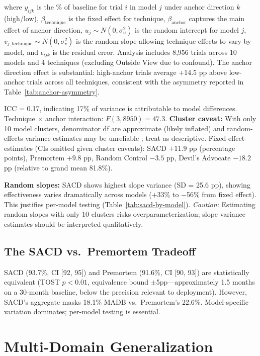 \documentclass[11pt]{article}
\begin{document}
where $y_{ijk}$ is the \% of baseline for trial $i$ in model $j$ under anchor direction $k$ (high/low), $\beta_{\text{technique}}$ is the fixed effect for technique, $\beta_{\text{anchor}}$ captures the main effect of anchor direction, $u_j \sim N(0, \sigma^2_u)$ is the random intercept for model $j$, $v_{j,\text{technique}} \sim N(0, \sigma^2_v)$ is the random slope allowing technique effects to vary by model, and $\epsilon_{ijk}$ is the residual error. Analysis includes 8,956 trials across 10 models and 4 techniques (excluding Outside View due to confound). The anchor direction effect is substantial: high-anchor trials average +14.5 pp above low-anchor trials across all techniques, consistent with the asymmetry reported in Table~\ref{tab:anchor-asymmetry}.

ICC = 0.17, indicating 17\% of variance is attributable to model differences. Technique $\times$ anchor interaction: $F(3, 8950) = 47.3$. \textbf{Cluster caveat:} With only 10 model clusters, denominator df are approximate (likely inflated) and random-effects variance estimates may be unreliable \citep{maas2005}; treat as descriptive. Fixed-effect estimates (CIs omitted given cluster caveats): SACD $+11.9$ pp (percentage points), Premortem $+9.8$ pp, Random Control $-3.5$ pp, Devil's Advocate $-18.2$ pp (relative to grand mean 81.8\%).

\textbf{Random slopes:} SACD shows highest slope variance (SD = 25.6 pp), showing effectiveness varies dramatically across models (+33\% to $-$56\% from fixed effect). This justifies per-model testing (Table~\ref{tab:sacd-by-model}). \textit{Caution:} Estimating random slopes with only 10 clusters risks overparameterization; slope variance estimates should be interpreted qualitatively.

\subsection{The SACD vs.\ Premortem Tradeoff}

SACD (93.7\%, CI [92, 95]) and Premortem (91.6\%, CI [90, 93]) are statistically equivalent (TOST $p < 0.01$, equivalence bound $\pm$5pp---approximately 1.5 months on a 30-month baseline, below the precision relevant to deployment). However, SACD's aggregate masks 18.1\% MADB vs.\ Premortem's 22.6\%. Model-specific variation dominates; per-model testing is essential.

\section{Multi-Domain Generalization}
\label{sec:multi-domain}
\end{document}
